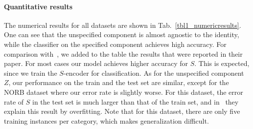 \documentclass[10pt,twocolumn,letterpaper]{article}
\begin{document}
\paragraph{Quantitative results} 
The numerical results for all datasets are shown in Tab.~\ref{tbl1_numericresults}. One can see that the unspecified component is almost agnostic to the identity, while the classifier on the specified component achieves high accuracy.
For comparison with~\cite{disentanglement}, we added to the table the results that were reported in their paper.  For most cases our model achieves higher accuracy for $S$. This is expected, since we train the $S$-encoder for classification. As for the unspecified component $Z$, our performance on the train and the test set are similar, except for the NORB dataset where our error rate is slightly worse.
For this dataset, the error rate of $S$ in the test set is much larger than that of the train set, and in~\cite{disentanglement} they explain this result by overfitting. Note that for this dataset, there are only five training instances per category, which makes generalization difficult.
\end{document}
